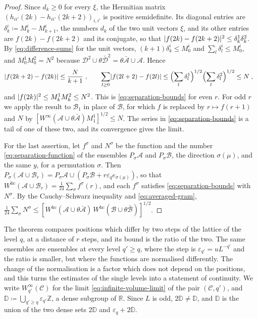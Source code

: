 \documentclass[11pt]{preprint}
\DeclarePairedDelimiter{\abs}{\lvert}{\rvert}
\numberwithin{equation}{section}
\theoremstyle{definition}
\theoremstyle{remark}
\theoremstyle{plain}
\begin{document}
\begin{proof}
Since $d_k \geq 0$ for every $\xi$, the Hermitian matrix $(h_{ii'}(2k) - h_{ii'}(2k + 2))_{i,i'}$ is positive semidefinite. Its diagonal entries are $\delta^i_k \coloneqq M^i_k - M^i_{k+1}$, the numbers $d_k$ of the two unit vectors $\xi$, and its other entries are $f(2k) - f(2k + 2)$ and its conjugate, so that $\abs{f(2k) - f(2k + 2)}^2 \leq \delta^1_k\delta^2_k$. By \eqref{eq:difference-sums} for the unit vectors, $(k + 1)\delta^i_k \leq M^i_0$ and $\sum_l\delta^i_l \leq M^i_0$, and $M^1_0M^2_0 = N^2$ because $\mathcal D^2 \cup \theta\bar{\mathcal D}^2 = \theta\bar{\mathcal A} \cup \mathcal A$. Hence
\begin{equation}\label{eq:even-differences}
    \abs{f(2k + 2) - f(2k)} \leq \frac{N}{k + 1}\;,
    \qquad
    \sum_{l \geq 0}\abs{f(2l + 2) - f(2l)} \leq \Bigl(\sum_l\delta^1_l\Bigr)^{1/2}\Bigl(\sum_l\delta^2_l\Bigr)^{1/2} \leq N\;,
\end{equation}
and $\abs{f(2k)}^2 \leq M^1_kM^2_k \leq N^2$. This is \eqref{eq:separation-bounds} for even $r$. For odd $r$ we apply the result to $\mathcal B_1$ in place of $\mathcal B$, for which $f$ is replaced by $r \mapsto f(r + 1)$ and $N$ by $[W^\infty(\mathcal A \cup \theta\bar{\mathcal A})M^1_1]^{1/2} \leq N$. The series in \eqref{eq:separation-bounds} is a tail of one of these two, and its convergence gives the limit.

For the last assertion, let $f^\sigma$ and $N^\sigma$ be the function and the number \eqref{eq:separation-function} of the ensembles $P_\sigma\mathcal A$ and $P_\sigma\mathcal B$, the direction $\sigma(\mu)$, and the same $y$, for a permutation $\sigma$. Then $P_\sigma(\mathcal A \cup \mathcal B_r) = P_\sigma\mathcal A \cup (P_\sigma\mathcal B + r\varepsilon_qe_{\sigma(\mu)})$, so that $W^{\mathrm{hc}}(\mathcal A \cup \mathcal B_r) = \frac{1}{24}\sum_\sigma f^\sigma(r)$, and each $f^\sigma$ satisfies \eqref{eq:separation-bounds} with $N^\sigma$. By the Cauchy--Schwarz inequality and \eqref{eq:averaged-gram}, $\frac{1}{24}\sum_\sigma N^\sigma \leq [W^{\mathrm{hc}}(\mathcal A \cup \theta\bar{\mathcal A})\,W^{\mathrm{hc}}(\mathcal B \cup \theta\bar{\mathcal B})]^{1/2}$.
\end{proof}

The theorem compares positions which differ by two steps of the lattice of the level $q$, at a distance of $r$ steps, and its bound is the ratio of the two. The same ensembles are ensembles at every level $q' \geq q$, where the step is $\varepsilon_{q'} = uL^{-q'}$ and the ratio is smaller, but where the functions are normalised differently. The change of the normalisation is a factor which does not depend on the positions, and this turns the estimates of the single levels into a statement of continuity. We write $W^\infty_{q'}(\mathcal C)$ for the limit \eqref{eq:infinite-volume-limit} of the pair $(\mathcal C, q')$, and $\mathbb D \coloneqq \bigcup_{q' \geq q}\varepsilon_{q'}\mathbb Z$, a dense subgroup of $\mathbb R$. Since $L$ is odd, $2\mathbb D \neq \mathbb D$, and $\mathbb D$ is the union of the two dense sets $2\mathbb D$ and $\varepsilon_q + 2\mathbb D$.
\end{document}
